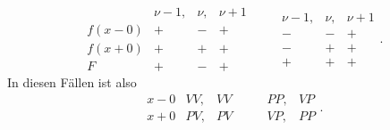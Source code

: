 %
%
\[
\begin{array}{|c|ccc|}
 & \nu-1, & \nu, & \nu+1 \\ \hline
f(x-0) & + & - & + \\
f(x+0) & + & + & + \\ \hline
F & + & - & +
\end{array}
\qquad
\begin{array}{|ccc|}
\nu-1, & \nu, & \nu+1 \\ \hline
- & - & + \\
- & + & + \\ \hline
+ & + & +
\end{array}.
\]
In diesen Fällen ist also
\[
\begin{array}{|c|cc|}
x-0 & VV, & VV \\
x+0 & PV, & PV
\end{array}
\qquad
\begin{array}{|cc|}
PP, & VP \\
VP, & PP
\end{array}.
\]
